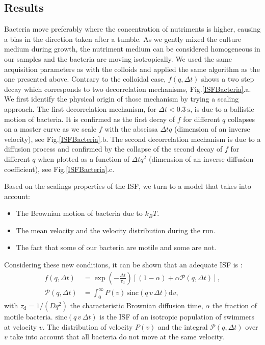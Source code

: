 \documentclass[%
 aip,
 jmp,%
 amsmath,amssymb,
reprint,%
]{revtex4-1}
\begin{document}
\subsection{Results}

Bacteria move preferably where the concentration of nutriments is higher, causing a bias in the direction taken after a tumble. As we gently mixed the culture medium during growth, the nutriment medium can be considered homogeneous in our samples and the bacteria are moving isotropically. We used the same acquisition parameters as with the colloids and applied the same algorithm as the one presented above. Contrary to the colloidal case, $f(q, \Delta t)$ shows a two step decay which corresponds to two decorrelation mechanisms, Fig.\ref{ISFBacteria}.a. We first identify the physical origin of those mechanism by trying a scaling approach. The first decorrelation mechanism, for $\Delta t < \SI{0.3}{\second}$, is due to a ballistic motion of bacteria. It is confirmed as the first decay of $f$  for different $q$  collapses on a master curve as we scale $f$ with the abscissa  $\Delta t q$ (dimension of an inverse velocity), see Fig.\ref{ISFBacteria}.b. The second decorrelation mechanism is due to a diffusion process and confirmed by the collapse of the second decay of $f$ for different $q$ when plotted as a function of $\Delta t q^2$ (dimension of an inverse diffusion coefficient), see Fig.\ref{ISFBacteria}.c.

Based on the scalings properties of the ISF, we turn to a model that takes into account:

\begin{itemize}
\item The Brownian motion of bacteria due to $k_BT$.
\item The mean velocity and the velocity distribution during the run.
\item The fact that some of our bacteria are motile and some are not.
\end{itemize}

Considering these new conditions, it can be shown that an adequate ISF is \citep{1_BactMobil}:
\begin{align}
f(q, \Delta t) &= \exp\left(-\frac{\Delta t}{\tau_\text{d}}\right)
\left[(1-\alpha) + \alpha \mathcal{P}(q, \Delta t)\right],\\
\mathcal{P}(q, \Delta t) &= \int_{0}^{\infty} P(v)\, \text{sinc}(q\, v\, \Delta t) \mathrm{d}v,
\end{align}
with $\tau_\text{d} = 1/(Dq^2)$ the characteristic Brownian diffusion time, $\alpha$ the fraction of motile bacteria. $\text{sinc}(q\, v\, \Delta t)$ is the ISF of an isotropic population of swimmers at velocity $v$. The distribution of velocity $P(v)$ and the integral $\mathcal{P}(q, \Delta t)$ over $v$ take into account that all bacteria do not move at the same velocity. 
\end{document}

